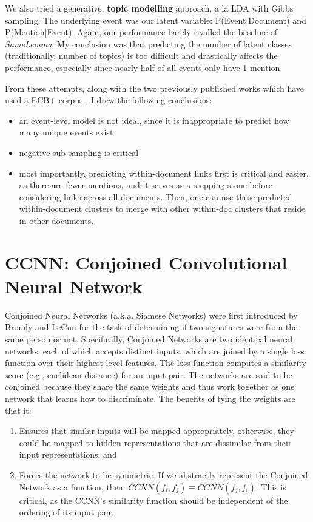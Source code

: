 We also tried a generative, \textbf{topic modelling} approach, a la LDA with Gibbs sampling.  The underlying event was our latent variable: P(Event|Document) and P(Mention|Event).  Again, our performance barely rivalled the baseline of \textit{SameLemma}.  My conclusion was that predicting the number of latent classes (traditionally, number of topics) is too difficult and drastically affects the performance, especially since nearly half of all events only have 1 mention.

From these attempts, along with the two previously published works which have used a ECB+ corpus \cite{journals/tacl/YangCF15, Choubey2017EventCR}, I drew the following conclusions:
\begin{itemize}
\item an event-level model is not ideal, since it is inappropriate to predict how many unique events exist
\item negative sub-sampling is critical
\item most importantly, predicting within-document links first is critical and easier, as there are fewer mentions, and it serves as a stepping stone before considering links across all documents.  Then, one can use these predicted within-document clusters to merge with other within-doc clusters that reside in other documents. 
\end{itemize}

\section{CCNN: Conjoined Convolutional Neural Network}
Conjoined Neural Networks (a.k.a. Siamese Networks) were first introduced by Bromly and LeCun \cite{SiameseNet} for the task of determining if two signatures were from the same person or not.  Specifically, Conjoined Networks are two identical neural networks, each of which accepts distinct inputs, which are joined by a single loss function over their highest-level features.  The loss function computes a similarity score (e.g., euclidean distance) for an input pair.  The networks are said to be conjoined because they share the same weights and thus work together as one network that learns how to discriminate.  The benefits of tying the weights are that it:
\begin{enumerate}
\item Ensures that similar inputs will be mapped appropriately, otherwise, they could be mapped to hidden representations that are dissimilar from their input representations; and
\item Forces the network to be symmetric. If we abstractly represent the Conjoined Network as a function, then:
$CCNN(f_i,f_j) \equiv CCNN(f_j,f_i)$.  This is critical, as the CCNN's similarity function should be independent of the ordering of its input pair.
\end{enumerate}

